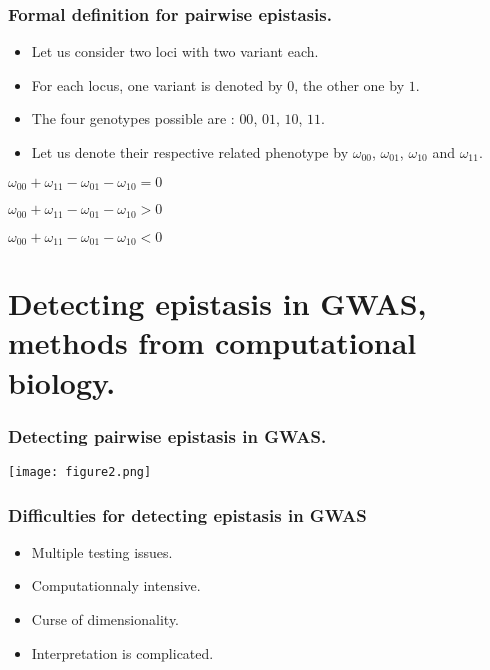 \documentclass[10pt]{beamer}
\begin{document}
\begin{frame}
\frametitle{Formal definition for pairwise epistasis.}

\begin{itemize}
\item<1-> Let us consider two loci with two variant each.
\item<1-> For each locus, one variant is denoted by $0$, the other one by $1$.
\item<1-> The four genotypes possible are :  $00$, $01$, $10$, $11$.
\item<1-> Let us denote their respective related phenotype by $\omega_{00}$, $\omega_{01}$, $\omega_{10}$ and $\omega_{11}$.
\end{itemize}

\begin{center}
\begin{minipage}{7cm}
\begin{description}
\item<2>[Absence of epistasis] $\omega_{00}+\omega_{11}-\omega_{01}-\omega_{10}=0$\\
\item<2>[Positive epistasis] $\omega_{00}+\omega_{11}-\omega_{01}-\omega_{10}>0$\\
\item<2>[Negative epistasis] $\omega_{00}+\omega_{11}-\omega_{01}-\omega_{10}<0$
\end{description}
\end{minipage}
\end{center}


\end{frame}


\section{Detecting epistasis in GWAS, methods from computational biology.}

\begin{frame}
\frametitle{Detecting pairwise epistasis in GWAS.}
	\begin{center}
       \texttt{[image: figure2.png]}
	\end{center}
\end{frame}

\begin{frame}
\frametitle{Difficulties for detecting epistasis in GWAS}

\begin{itemize}
\Large
\item Multiple testing issues.
\item Computationnaly intensive.
\item Curse of dimensionality.
\item Interpretation is complicated. 
\end{itemize}

\end{frame}
\end{document}
